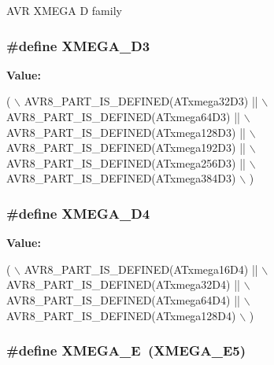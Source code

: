 A\-V\-R X\-M\-E\-G\-A D family \hypertarget{group__xmega__part__macros__group_gad634208a506f79622c67be500014feb3}{
\subsubsection[{X\-M\-E\-G\-A\-\_\-\-D3}]{\setlength{\rightskip}{0pt plus 5cm}\#define X\-M\-E\-G\-A\-\_\-\-D3}}\label{group__xmega__part__macros__group_gad634208a506f79622c67be500014feb3}
{\bfseries Value\-:}
\begin{DoxyCode}
( \(\backslash\)
                AVR8\_PART\_IS\_DEFINED(ATxmega32D3)  || \(\backslash\)
                AVR8\_PART\_IS\_DEFINED(ATxmega64D3)  || \(\backslash\)
                AVR8\_PART\_IS\_DEFINED(ATxmega128D3) || \(\backslash\)
                AVR8\_PART\_IS\_DEFINED(ATxmega192D3) || \(\backslash\)
                AVR8\_PART\_IS\_DEFINED(ATxmega256D3) || \(\backslash\)
                AVR8\_PART\_IS\_DEFINED(ATxmega384D3) \(\backslash\)
                )
\end{DoxyCode}
\hypertarget{group__xmega__part__macros__group_ga831e633408c7458a445d333b9b3f142f}{
\subsubsection[{X\-M\-E\-G\-A\-\_\-\-D4}]{\setlength{\rightskip}{0pt plus 5cm}\#define X\-M\-E\-G\-A\-\_\-\-D4}}\label{group__xmega__part__macros__group_ga831e633408c7458a445d333b9b3f142f}
{\bfseries Value\-:}
\begin{DoxyCode}
( \(\backslash\)
                AVR8\_PART\_IS\_DEFINED(ATxmega16D4)  || \(\backslash\)
                AVR8\_PART\_IS\_DEFINED(ATxmega32D4)  || \(\backslash\)
                AVR8\_PART\_IS\_DEFINED(ATxmega64D4)  || \(\backslash\)
                AVR8\_PART\_IS\_DEFINED(ATxmega128D4) \(\backslash\)
                )
\end{DoxyCode}
\hypertarget{group__xmega__part__macros__group_gaab6d2543c5128fca0b1aeecb5c080723}{
\subsubsection[{X\-M\-E\-G\-A\-\_\-\-E}]{\setlength{\rightskip}{0pt plus 5cm}\#define X\-M\-E\-G\-A\-\_\-\-E~(X\-M\-E\-G\-A\-\_\-\-E5)}}\label{group__xmega__part__macros__group_gaab6d2543c5128fca0b1aeecb5c080723}
